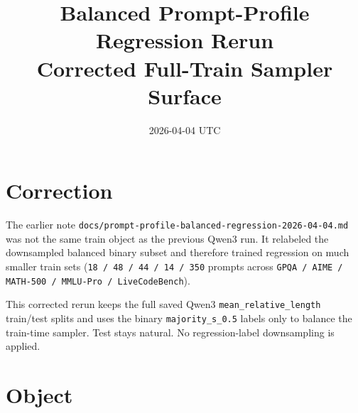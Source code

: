 \documentclass[11pt]{article}
\title{Balanced Prompt-Profile Regression Rerun\\Corrected Full-Train Sampler Surface}
\author{}
\date{2026-04-04 UTC}
\begin{document}
\maketitle

\section{Correction}

The earlier note \texttt{docs/prompt-profile-balanced-regression-2026-04-04.md}
was not the same train object as the previous Qwen3 run. It relabeled the
downsampled balanced binary subset and therefore trained regression on much
smaller train sets (\texttt{18 / 48 / 44 / 14 / 350} prompts across
\texttt{GPQA / AIME / MATH-500 / MMLU-Pro / LiveCodeBench}).

This corrected rerun keeps the full saved Qwen3 \texttt{mean\_relative\_length}
train/test splits and uses the binary \texttt{majority\_s\_0.5} labels only to
balance the train-time sampler. Test stays natural. No regression-label
downsampling is applied.

\section{Object}
\end{document}
